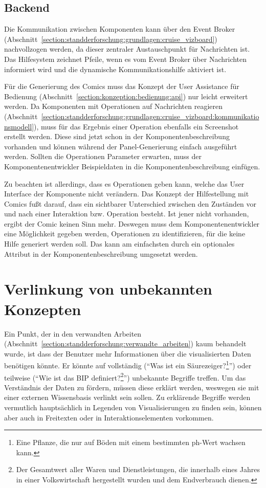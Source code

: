 \documentclass[
	headsepline,
	footsepline,
	fontsize=12pt,
	bibliography=totoc
]{scrbook}
\begin{document}
\subsection{Backend}
\label{section:konzeption:kommunikation:backend}

Die Kommunikation zwischen Komponenten kann über den Event Broker (Abschnitt~\ref{section:standderforschung:grundlagen:cruise_vizboard}) nachvollzogen werden, da dieser zentraler Austauschpunkt für Nachrichten ist. Das Hilfesystem zeichnet Pfeile, wenn es vom Event Broker über Nachrichten informiert wird und die dynamische Kommunikationshilfe aktiviert ist.

Für die Generierung des Comics muss das Konzept der User Assistance für Bedienung (Abschnitt~\ref{section:konzeption:bedienung:api}) nur leicht erweitert werden. Da Komponenten mit Operationen auf Nachrichten reagieren (Abschnitt~\ref{section:standderforschung:grundlagen:cruise_vizboard:kommunikationsmodell}), muss für das Ergebnis einer Operation ebenfalls ein Screenshot erstellt werden. Diese sind jetzt schon in der Komponentenbeschreibung vorhanden und können während der Panel-Generierung einfach ausgeführt werden. Sollten die Operationen Parameter erwarten, muss der Komponentenentwickler Beispieldaten in die Komponentenbeschreibung einfügen.

Zu beachten ist allerdings, dass es Operationen geben kann, welche das User Interface der Komponente nicht verändern. Das Konzept der Hilfestellung mit Comics fußt darauf, dass ein sichtbarer Unterschied zwischen den Zuständen vor und nach einer Interaktion bzw. Operation besteht. Ist jener nicht vorhanden, ergibt der Comic keinen Sinn mehr. Deswegen muss dem Komponentenentwickler eine Möglichkeit gegeben werden, Operationen zu identifizieren, für die keine Hilfe generiert werden soll. Das kann am einfachsten durch ein optionales Attribut in der Komponentenbeschreibung umgesetzt werden.

\section{Verlinkung von unbekannten Konzepten}
\label{section:konzeption:verlinkung}


Ein Punkt, der in den verwandten Arbeiten (Abschnitt~\ref{section:standderforschung:verwandte_arbeiten}) kaum behandelt wurde, ist dass der Benutzer mehr Informationen über die visualisierten Daten benötigen könnte. Er könnte auf vollständig (\enquote{Was ist ein Säurezeiger?\footnote{Eine Pflanze, die nur auf Böden mit einem bestimmten ph-Wert wachsen kann.}}) oder teilweise (\enquote{Wie ist das BIP definiert?\footnote{Der Gesamtwert aller Waren und Dienstleistungen, die innerhalb eines Jahres in einer Volkswirtschaft hergestellt wurden und dem Endverbrauch dienen.}}) unbekannte Begriffe treffen. Um das Verständnis der Daten zu fördern, müssen diese erklärt werden, weswegen sie mit einer externen Wissensbasis verlinkt sein sollen. Zu erklärende Begriffe werden vermutlich hauptsächlich in Legenden von Visualisierungen zu finden sein, können aber auch in Freitexten oder in Interaktionselementen vorkommen.
\end{document}
